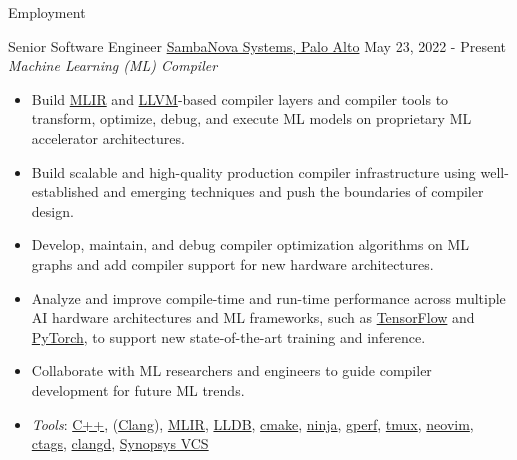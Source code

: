 \documentclass[]{mcdowellcv}
\begin{document}
    \makeheader

    \begin{cvsection}{Employment}

        \begin{cvsubsection}
          {Senior Software Engineer}
          {\href{https://sambanova.ai/}{SambaNova Systems, Palo Alto}}
          {May 23, 2022 - Present}
            \textit{Machine Learning (ML) Compiler}
            \begin{itemize}
              \item
                Build \href{https://mlir.llvm.org/}{MLIR} and
                \href{https://llvm.org/}{LLVM}-based compiler layers and
                compiler tools to transform, optimize, debug, and execute ML
                models on proprietary ML accelerator architectures.
              \item
                Build scalable and high-quality production compiler
                infrastructure using well-established and emerging techniques
                and push the boundaries of compiler design.
              \item
                Develop, maintain, and debug compiler optimization algorithms
                on ML graphs and add compiler support for new hardware
                architectures.
              \item
                Analyze and improve compile-time and run-time performance
                across multiple AI hardware architectures and ML frameworks,
                such as \href{https://www.tensorflow.org/}{TensorFlow} and
                \href{https://pytorch.org/}{PyTorch}, to support new
                state-of-the-art training and inference.
              \item
                Collaborate with ML researchers and engineers to guide compiler
                development for future ML trends.
              \item
                \textit{Tools}: \href{https://isocpp.org/}{C++},
                (\href{https://clang.llvm.org/}{Clang}),
                \href{https://mlir.llvm.org/}{MLIR},
                \href{https://lldb.llvm.org/}{LLDB},
                \href{https://cmake.org/}{cmake},
                \href{https://ninja-build.org/}{ninja},
                \href{https://gperftools.github.io/gperftools/cpuprofile.html}{gperf},
                \href{https://github.com/tmux/tmux}{tmux},
                \href{https://neovim.io/}{neovim},
                \href{https://github.com/universal-ctags/ctags}{ctags},
                \href{https://clangd.llvm.org/}{clangd},
                \href{https://www.synopsys.com/verification/simulation/vcs.html}{Synopsys
                VCS}
            \end{itemize}
        \end{cvsubsection}


\end{cvsection}
\end{document}
